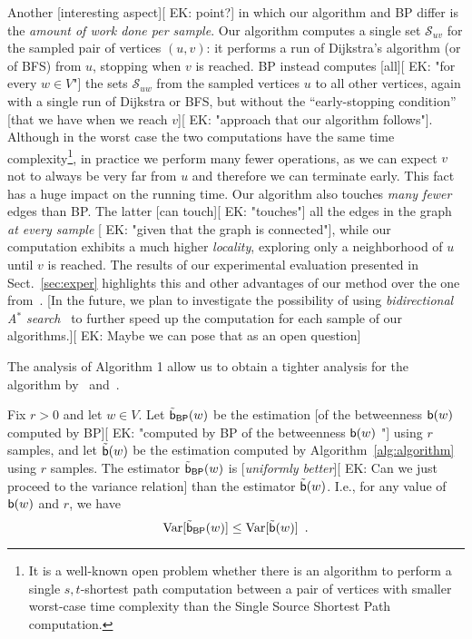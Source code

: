 Another [interesting aspect][ EK: point?] in which our algorithm and \textsf{BP} differ is the
\emph{amount of work done per sample}. Our algorithm computes a single set
$\mathcal{S}_{uv}$ for the sampled pair of vertices $(u,v)$: it performs a run
of Dijkstra's algorithm (or of BFS) from $u$, stopping when $v$ is reached.
\textsf{BP} instead computes [all][ EK: "for every $w\in V$"] the sets $\mathcal{S}_{uw}$ from the sampled
vertices $u$ to all other vertices, again with a single run of Dijkstra or BFS,
but without the ``early-stopping condition'' [that we have when we reach $v$][ EK: "approach that our algorithm follows"].
Although in the worst case the two computations have the same time
complexity\footnote{It is a well-known open problem whether there is an
algorithm to perform a single $s,t$-shortest path computation between a pair of
vertices with smaller worst-case time complexity than the Single Source Shortest
Path computation.}, in practice we perform many fewer operations, as we can
expect $v$ not to always be very far from $u$ and therefore we can terminate
early. This fact has a huge impact on the running time. Our algorithm also
touches \emph{many fewer} edges than \textsf{BP}. The latter [can touch][ EK: "touches"] all the
edges in the graph \emph{at every sample} [ EK: "given that the graph is connected"], while our computation exhibits a much
higher \emph{locality}, exploring only a neighborhood of $u$ until $v$ is
reached. The results of our experimental evaluation presented in
Sect.~\ref{sec:exper} highlights this and other advantages of our method over
the one from~\citep{JacobKLPT05,BrandesP07}. [In the future, we plan to
investigate the possibility of using \emph{bidirectional A$^*$
search}~\citep{Pohl69,KaindlK97} to further speed up the computation for each
sample of our algorithms.][ EK: Maybe we can pose that as an open question]

\ifproof
The analysis of Algorithm 1 allow us to obtain a tighter analysis for the
algorithm by~\citet{BrandesP07} and~\citet{JacobKLPT05}.

\begin{lemma}\label{lem:variance}
  Fix $r>0$ and let $w\in V$. Let $\tilde{\mathsf{b}}_\mathsf{BP}(w)$ be the estimation
  [of the betweenness $\mathsf{b}(w)$ computed by \textsf{BP}][ EK: "computed by \textsf{BP} of the betweenness $\mathsf{b}(w)$ "] using $r$ samples, and
  let $\tilde{\mathsf{b}}(w)$ be the estimation computed by
  Algorithm~\ref{alg:algorithm} using $r$ samples. The estimator
  $\tilde{\mathsf{b}}_\mathsf{BP}(w)$ is [\emph{uniformly better}][ EK: Can we just proceed to the variance 
  relation] than the estimator
  $\tilde{\mathsf{b}}(w)$. I.e., for any value of $\mathsf{b}(w)$ and $r$, we have
  \[
  \mathrm{Var}[\tilde{\mathsf{b}}_\mathsf{BP}(w)]\le\mathrm{Var}[\tilde{\mathsf{b}}(w)]\enspace.
  \]
\end{lemma}

